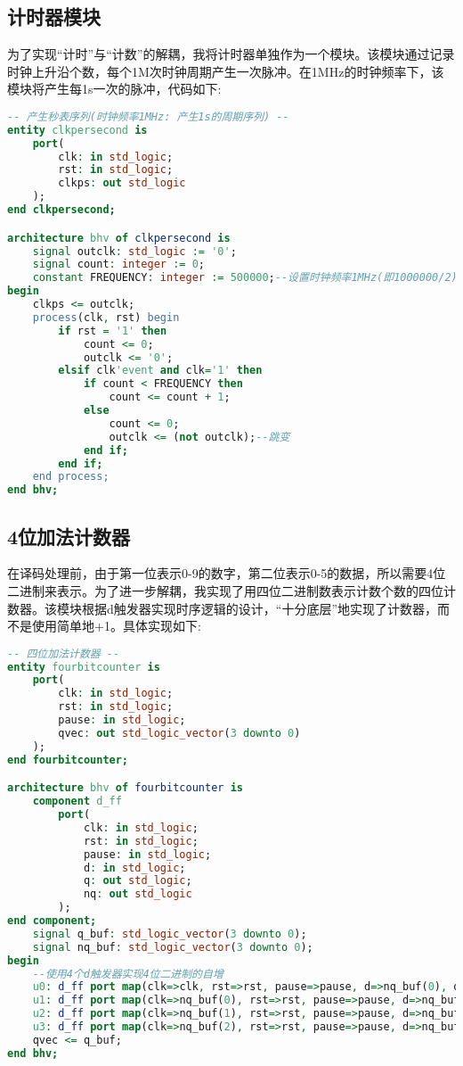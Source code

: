 \documentclass[UTF8, onecolumn, a4paper]{article}
\begin{document}
\subsection{计时器模块}
为了实现“计时”与“计数”的解耦，我将计时器单独作为一个模块。该模块通过记录时钟上升沿个数，每个1M次时钟周期产生一次脉冲。在1MHz的时钟频率下，该模块将产生每1s一次的脉冲，代码如下:
\begin{lstlisting}[language={VHDL}, title={clkpersecond.vhd}]
-- 产生秒表序列(时钟频率1MHz: 产生1s的周期序列) --
entity clkpersecond is
	port(
		clk: in std_logic;
		rst: in std_logic;
		clkps: out std_logic
	);
end clkpersecond;

architecture bhv of clkpersecond is
	signal outclk: std_logic := '0';
	signal count: integer := 0;
	constant FREQUENCY: integer := 500000;--设置时钟频率1MHz(即1000000/2)
begin
	clkps <= outclk;
	process(clk, rst) begin
		if rst = '1' then
			count <= 0;
			outclk <= '0';
		elsif clk'event and clk='1' then
			if count < FREQUENCY then
				count <= count + 1;
			else
				count <= 0;
				outclk <= (not outclk);--跳变
			end if;
		end if;
	end process;
end bhv;
\end{lstlisting}
\subsection{4位加法计数器}
在译码处理前，由于第一位表示0-9的数字，第二位表示0-5的数据，所以需要4位二进制来表示。为了进一步解耦，我实现了用四位二进制数表示计数个数的四位计数器。该模块根据d触发器实现时序逻辑的设计，“十分底层”地实现了计数器，而不是使用简单地+1。具体实现如下:
\begin{lstlisting}[language={VHDL}, title={fourbitcounter.vhd}]
-- 四位加法计数器 --
entity fourbitcounter is
	port(
		clk: in std_logic;
		rst: in std_logic;
		pause: in std_logic;
		qvec: out std_logic_vector(3 downto 0)
	);
end fourbitcounter;

architecture bhv of fourbitcounter is
	component d_ff
		port(
			clk: in std_logic;
			rst: in std_logic;
			pause: in std_logic;
			d: in std_logic;
			q: out std_logic;
			nq: out std_logic
		);
end component;
	signal q_buf: std_logic_vector(3 downto 0);
	signal nq_buf: std_logic_vector(3 downto 0);
begin
	--使用4个d触发器实现4位二进制的自增
	u0: d_ff port map(clk=>clk, rst=>rst, pause=>pause, d=>nq_buf(0), q=>q_buf(0), nq=>nq_buf(0) );
	u1: d_ff port map(clk=>nq_buf(0), rst=>rst, pause=>pause, d=>nq_buf(1), q=>q_buf(1), nq=>nq_buf(1) );
	u2: d_ff port map(clk=>nq_buf(1), rst=>rst, pause=>pause, d=>nq_buf(2), q=>q_buf(2), nq=>nq_buf(2) );
	u3: d_ff port map(clk=>nq_buf(2), rst=>rst, pause=>pause, d=>nq_buf(3), q=>q_buf(3), nq=>nq_buf(3) );
	qvec <= q_buf;
end bhv;
\end{lstlisting}
\end{document}

